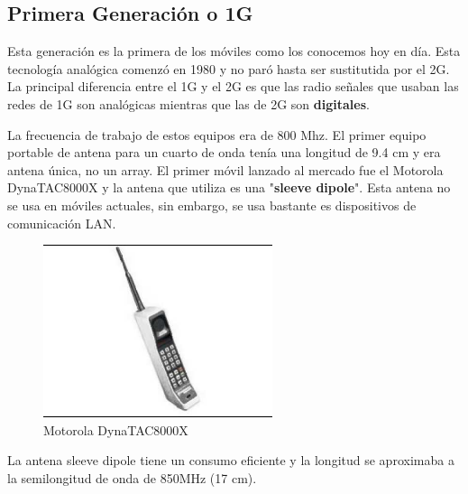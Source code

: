 \documentclass[a4paper,11pt,titlepage]{article}
\begin{document}
\subsection{Primera Generación o 1G}
Esta generación es la primera de los móviles como los conocemos hoy en día. Esta tecnología analógica comenzó en 1980 y no paró hasta ser sustitutida por el 2G. La principal diferencia entre el 1G y el 2G es que las radio señales que usaban las redes de 1G son analógicas mientras que las de 2G son \textbf{digitales}.\par
La frecuencia de trabajo de estos equipos era de 800 Mhz.
El primer equipo portable de antena para un cuarto de onda tenía una longitud de 9.4 cm y era antena única, no un array.
El primer móvil lanzado al mercado fue el Motorola DynaTAC8000X y la antena que utiliza es una "\textbf{sleeve dipole}". Esta antena no se usa en móviles actuales, sin embargo, se usa bastante es dispositivos de comunicación LAN.\par
\begin{figure}[H]
\centering
\includegraphics[width=0.6\textwidth]{motorola1}
\caption{Motorola DynaTAC8000X}

\label{motoroladyna}
\end{figure}
La antena sleeve dipole tiene un consumo eficiente y la longitud se aproximaba a la semilongitud de onda de 850MHz (17 cm).
\end{document}
